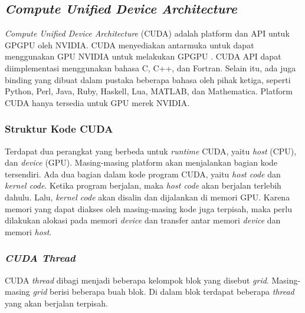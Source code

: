   \subsection{\emph{Compute Unified Device Architecture}}

    \emph{Compute Unified Device Architecture} (CUDA) adalah platform dan API untuk GPGPU oleh NVIDIA. CUDA menyediakan antarmuka untuk dapat menggunakan GPU NVIDIA untuk melakukan GPGPU \parencite{cuda}. CUDA API dapat diimplementasi menggunakan bahasa C, C++, dan Fortran. Selain itu, ada juga binding yang dibuat dalam pustaka beberapa bahasa oleh pihak ketiga, seperti Python, Perl, Java, Ruby, Haskell, Lua, MATLAB, dan Mathematica. Platform CUDA hanya tersedia untuk GPU merek NVIDIA.

    \subsubsection{Struktur Kode CUDA}

      Terdapat dua perangkat yang berbeda untuk \emph{runtime} CUDA, yaitu \emph{host} (CPU), dan \emph{device} (GPU). Masing-masing platform akan menjalankan bagian kode tersendiri. Ada dua bagian dalam kode program CUDA, yaitu \emph{host code} dan \emph{kernel code}. Ketika program berjalan, maka \emph{host code} akan berjalan terlebih dahulu. Lalu, \emph{kernel code} akan disalin dan dijalankan di memori GPU. Karena memori yang dapat diakses oleh masing-masing kode juga terpisah, maka perlu dilakukan alokasi pada memori \emph{device} dan transfer antar memori \emph{device} dan memori \emph{host}.

    \subsubsection{\emph{CUDA Thread}}

      CUDA \emph{thread} dibagi menjadi beberapa kelompok blok yang disebut \emph{grid}. Masing-masing \emph{grid} berisi beberapa buah blok. Di dalam blok terdapat beberapa \emph{thread} yang akan berjalan terpisah. 

